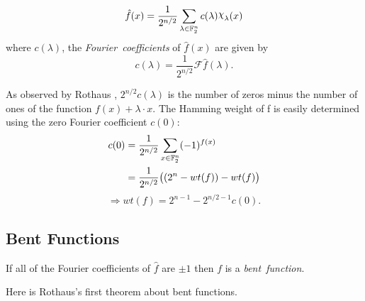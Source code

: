 
\begin{lemma}
\begin{equation}\label{eqn:rewrite-pseudo}
	\hat{f}(x)
    =\frac{1}{2^{n/2}}
      \sum_{\lambda\in\gftwo^n}c(\lambda)\Chi_\lambda(x)
\end{equation}
	where $c(\lambda)$, the {\em Fourier\ coefficients} of $\hat{f}(x)$ are
  given by
	\[
  c(\lambda)=\frac{1}{2^{n/2}}\mathcal{F}\hat{f}(\lambda).
	\]
\end{lemma}

\par As observed by Rothaus \cite{art:r76}, $2^{n/2}c(\lambda)$ is the
number of zeros minus the number of ones of the function
$f(x)+\lambda\cdot x$. The Hamming weight of f is easily determined using
the zero Fourier coefficient $c(0)$:
\begin{align*}
	c(0)&=\frac{1}{2^{n/2}}\sum_{x\in\mathbb{F}_2^n}(-1)^{f(x)}\\
	&=\frac{1}{2^{n/2}}\big((2^n-wt(f))-wt(f)\big)
\end{align*}
\begin{equation}
  \Rightarrow wt(f)=2^{n-1}-2^{n/2-1}c(0).
\end{equation}

\subsection{Bent Functions}
\begin{definition}\label{def:bent-function}
  If all of the Fourier coefficients of $\hat{f}$ are $\pm1$ then
  $f$ is a {\em bent\ function}.
\end{definition}

\par Here is Rothaus's first theorem about bent functions.

